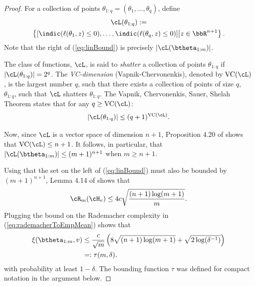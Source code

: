 \documentclass[letterpaper, 10 pt, conference]{ieeeconf}  %
\begin{document}
\begin{proof}
  For a collection of points $\theta_{1:q}=(\theta_1,\ldots,\theta_q)$, define 
  \begin{multline*}
  \cL(\theta_{1:q}):=\\
  \left\{[\indic(\ell(\theta_1,z)\le 0),\ldots, \indic(\ell(\theta_q,z)\le 0)] \middle| z\in\bbR^{n+1} \right\}. 
\end{multline*}
Note that the right of (\ref{eq:linBound}) is precisely $|\cL(\btheta_{1:m})|$.

The class of functions, $\cL$, is said to \emph{shatter} a collection of points $\theta_{1:q}$ if $|\cL(\theta_{1:q})|=2^q$. The \emph{VC-dimension} (Vapnik-Chervonenkis), denoted by $\mathrm{VC}(\cL)$,  is the largest number $q$, such that there exists a collection of points of size $q$, $\theta_{1:q}$, such that  $\cL$ shatters $\theta_{1:q}$. 
The Vapnik, Chervonenkis, Sauer, Shelah Theorem states that for any $q\ge \mathrm{VC}(\cL)$:
$$
|\cL(\theta_{1:q})|\le (q+1)^{\mathrm{VC}(\cL)}.
$$


Now, since $\cL$ is a vector space of dimension $n+1$, Proposition 4.20 of \cite{wainwright2019high} shows that $\mathrm{VC}(\cL)\le n+1$. It follows, in particular, that $|\cL(\btheta_{1:m})|\le (m+1)^{n+1}$ when $m\ge n+1$.

Using that the set on the left of (\ref{eq:linBound}) must also be bounded by $(m+1)^{n+1}$,  Lemma 4.14 of \cite{wainwright2019high} shows that
$$
\cR_m(\cH_v)\le 4c \sqrt{\frac{(n+1)\log(m+1)}{m}}.
$$
Plugging the bound on the Rademacher complexity in (\ref{eq:rademacherToEmpMean}) shows that
\begin{align}
  \nonumber
  \xi(\btheta_{1:m},v)
  &\le
    \frac{c}{\sqrt{m}}\left(8\sqrt{(n+1)\log(m+1)}+\sqrt{2\log(\delta^{-1})}\right)\\
  \label{eq:empMeanBound}
  &=:\tau(m,\delta).
\end{align}
with probability at least $1-\delta$. The bounding function $\tau$ was defined for compact notation in the argument below.


\end{proof}
\end{document}
